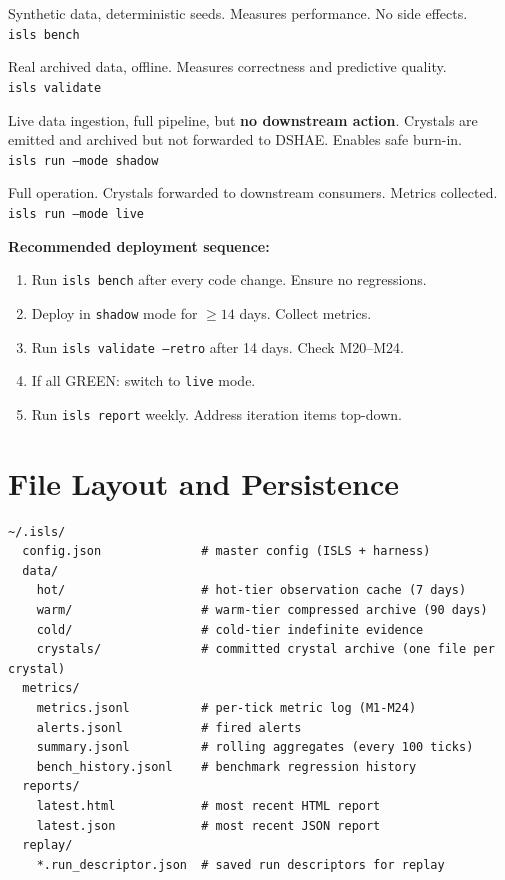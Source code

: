 \documentclass[10pt,a4paper]{article}
\begin{document}
\begin{specbox}
\begin{description}[nosep,leftmargin=2.5cm,style=sameline]
\item[Bench] Synthetic data, deterministic seeds. Measures performance. No side effects. \\ \texttt{isls bench}
\item[Validate] Real archived data, offline. Measures correctness and predictive quality. \\ \texttt{isls validate}
\item[Shadow] Live data ingestion, full pipeline, but \textbf{no downstream action}. Crystals are emitted and archived but not forwarded to DSHAE. Enables safe burn-in. \\ \texttt{isls run --mode shadow}
\item[Live] Full operation. Crystals forwarded to downstream consumers. Metrics collected. \\ \texttt{isls run --mode live}
\end{description}
\end{specbox}

\textbf{Recommended deployment sequence:}
\begin{enumerate}[nosep]
\item Run \texttt{isls bench} after every code change. Ensure no regressions.
\item Deploy in \texttt{shadow} mode for $\geq 14$ days. Collect metrics.
\item Run \texttt{isls validate --retro} after 14 days. Check M20--M24.
\item If all GREEN: switch to \texttt{live} mode.
\item Run \texttt{isls report} weekly. Address iteration items top-down.
\end{enumerate}

\section{File Layout and Persistence}
\label{sec:files}

\begin{lstlisting}[style=yaml]
~/.isls/
  config.json              # master config (ISLS + harness)
  data/
    hot/                   # hot-tier observation cache (7 days)
    warm/                  # warm-tier compressed archive (90 days)
    cold/                  # cold-tier indefinite evidence
    crystals/              # committed crystal archive (one file per crystal)
  metrics/
    metrics.jsonl          # per-tick metric log (M1-M24)
    alerts.jsonl           # fired alerts
    summary.jsonl          # rolling aggregates (every 100 ticks)
    bench_history.jsonl    # benchmark regression history
  reports/
    latest.html            # most recent HTML report
    latest.json            # most recent JSON report
  replay/
    *.run_descriptor.json  # saved run descriptors for replay
\end{lstlisting}
\end{document}

